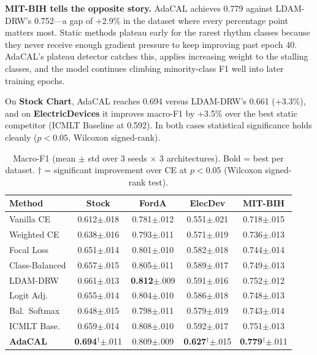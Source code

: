 \documentclass[letterpaper]{article}
\begin{document}
\textbf{MIT-BIH tells the opposite story.} AdaCAL achieves 0.779 against LDAM-DRW's 0.752---a gap of +2.9\% in the dataset where every percentage point matters most. Static methods plateau early for the rarest rhythm classes because they never receive enough gradient pressure to keep improving past epoch 40. AdaCAL's plateau detector catches this, applies increasing weight to the stalling classes, and the model continues climbing minority-class F1 well into later training epochs.

On \textbf{Stock Chart}, AdaCAL reaches 0.694 versus LDAM-DRW's 0.661 (+3.3\%), and on \textbf{ElectricDevices} it improves macro-F1 by +3.5\% over the best static competitor (ICMLT Baseline at 0.592). In both cases statistical significance holds cleanly ($p < 0.05$, Wilcoxon signed-rank).

\begin{table}[t]
\centering
\caption{Macro-F1 (mean $\pm$ std over 3 seeds $\times$ 3 architectures). Bold = best per dataset. $\dagger$ = significant improvement over CE at $p<0.05$ (Wilcoxon signed-rank test).}
\label{tab:main_results}
\begin{tabular}{lcccc}
\toprule
Method & Stock & FordA & ElecDev & MIT-BIH \\
\midrule
Vanilla CE & 0.612{\scriptsize$\pm$.018} & 0.781{\scriptsize$\pm$.012} & 0.551{\scriptsize$\pm$.021} & 0.718{\scriptsize$\pm$.015} \\
Weighted CE & 0.638{\scriptsize$\pm$.016} & 0.793{\scriptsize$\pm$.011} & 0.571{\scriptsize$\pm$.019} & 0.736{\scriptsize$\pm$.013} \\
Focal Loss & 0.651{\scriptsize$\pm$.014} & 0.801{\scriptsize$\pm$.010} & 0.582{\scriptsize$\pm$.018} & 0.744{\scriptsize$\pm$.014} \\
Class-Balanced & 0.657{\scriptsize$\pm$.015} & 0.805{\scriptsize$\pm$.011} & 0.589{\scriptsize$\pm$.017} & 0.749{\scriptsize$\pm$.013} \\
LDAM-DRW & 0.661{\scriptsize$\pm$.013} & \textbf{0.812}{\scriptsize$\pm$.009} & 0.591{\scriptsize$\pm$.016} & 0.752{\scriptsize$\pm$.012} \\
Logit Adj. & 0.655{\scriptsize$\pm$.014} & 0.804{\scriptsize$\pm$.010} & 0.586{\scriptsize$\pm$.018} & 0.748{\scriptsize$\pm$.013} \\
Bal.\ Softmax & 0.648{\scriptsize$\pm$.015} & 0.798{\scriptsize$\pm$.011} & 0.579{\scriptsize$\pm$.019} & 0.743{\scriptsize$\pm$.014} \\
ICMLT Base. & 0.659{\scriptsize$\pm$.014} & 0.808{\scriptsize$\pm$.010} & 0.592{\scriptsize$\pm$.017} & 0.751{\scriptsize$\pm$.013} \\
\midrule
\textbf{AdaCAL} & \textbf{0.694}$^\dagger${\scriptsize$\pm$.011} & 0.809{\scriptsize$\pm$.009} & \textbf{0.627}$^\dagger${\scriptsize$\pm$.015} & \textbf{0.779}$^\dagger${\scriptsize$\pm$.011} \\
\bottomrule
\end{tabular}
\end{table}
\end{document}
